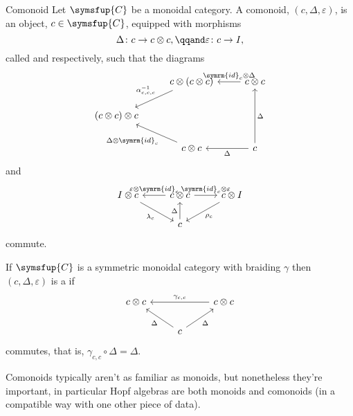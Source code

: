 \documentclass[fleqn]{NotesClass}
\newcommand{\cat}[1]{\symsfup{#1}}
\newcommand{\id}{\symrm{id}}
\begin{document}
    \begin{dfn}{Comonoid}{}
        Let \(\cat{C}\) be a monoidal category.
        A comonoid, \((c, \Delta, \varepsilon)\), is an object, \(c \in \cat{C}\), equipped with morphisms
        \begin{equation}
            \Delta \colon c \to c \otimes c, \qqand \varepsilon \colon c \to I,
        \end{equation}
        called  and  respectively, such that the diagrams
        \begin{equation}
            \begin{tikzcd}
                & c \otimes (c \otimes c) \arrow[dl, "{\alpha_{c,c,c}^{-1}}"', pos=0.4] &  c \otimes c \arrow[l, "\id_c \otimes \Delta"']\\
                (c \otimes c) \otimes c\\
                & c \otimes c \arrow[ul, "\Delta \otimes \id_c", pos=0.4] & c \arrow[l, "\Delta"] \arrow[uu, "\Delta"']
            \end{tikzcd}
        \end{equation}
        and
        \begin{equation}
            \begin{tikzcd}
                I \otimes c \arrow[dr, "\lambda_c"'] & c \otimes c \arrow[l, "\varepsilon \otimes \id_c"'] \arrow[r, "\id_c \otimes \varepsilon"] & c \otimes I \arrow[dl, "\rho_c"]\\
                & c \arrow[u, "\Delta"]
            \end{tikzcd}
        \end{equation}
        commute.
        
        If \(\cat{C}\) is a symmetric monoidal category with braiding \(\gamma\) then \((c, \Delta, \varepsilon)\) is a  if
        \begin{equation}
            \begin{tikzcd}
                c \otimes c && c \otimes c \arrow[ll, "{\gamma_{c,c}}"']\\
                & c \arrow[ul, "\Delta"] \arrow[ur, "\Delta"']
            \end{tikzcd}
        \end{equation}
        commutes, that is, \(\gamma_{c,c} \circ \Delta = \Delta\).
    \end{dfn}
    
    Comonoids typically aren't as familiar as monoids, but nonetheless they're important, in particular Hopf algebras are both monoids and comonoids (in a compatible way with one other piece of data).
    
\end{document}
